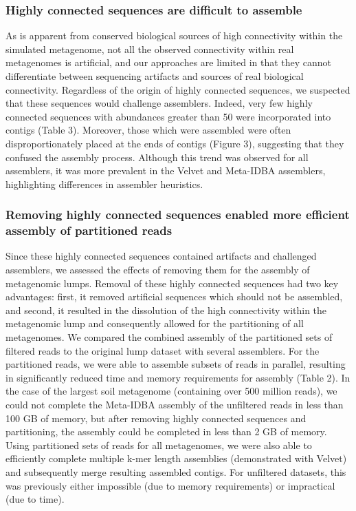 \documentclass[10pt]{article}
\begin{document}
\subsubsection*{Highly connected sequences are difficult to assemble}

As is apparent from conserved biological sources of high connectivity
within the simulated metagenome, not all the observed connectivity
within real metagenomes is artificial, and our approaches are limited
in that they cannot differentiate between sequencing artifacts and
sources of real biological connectivity.  Regardless of the origin of
highly connected sequences, we suspected that these sequences would
challenge assemblers.  Indeed, very few highly connected sequences with
abundances greater than 50 were incorporated into contigs (Table
3). Moreover, those which were assembled were often disproportionately placed
at the ends of contigs (Figure 3), suggesting that they confused the
assembly process.  Although this trend was
observed for all assemblers, it was more prevalent in the Velvet and
Meta-IDBA assemblers, highlighting differences in assembler
heuristics.

\subsubsection*{Removing highly connected sequences enabled more efficient assembly of partitioned reads}

Since these highly connected sequences contained artifacts and 
challenged assemblers,
we assessed the
effects of removing them for the assembly of metagenomic lumps.
Removal of these highly connected sequences had two key
advantages: first, it removed artificial sequences which should not be
assembled, and second, it resulted in the dissolution of the high
connectivity within the metagenomic lump and consequently allowed for
the partitioning of all metagenomes.  We compared the combined
assembly of the partitioned sets of filtered reads to the original
lump dataset with several assemblers.  For the partitioned reads, we
were able to assemble subsets of reads in parallel, resulting in
significantly reduced time and memory requirements for assembly (Table
2).  In the case of the largest soil metagenome (containing over 500
million reads), we could not complete the Meta-IDBA assembly of the
unfiltered reads in less than 100 GB of memory, but after removing
highly connected sequences and partitioning, the assembly could be
completed in less than 2 GB of memory.  Using partitioned sets of
reads for all metagenomes, we were also able to efficiently complete
multiple k-mer length assemblies (demonstrated with Velvet) and
subsequently merge resulting assembled contigs.  For unfiltered
datasets, this was previously either impossible (due to memory
requirements) or impractical (due to time).
\end{document}
